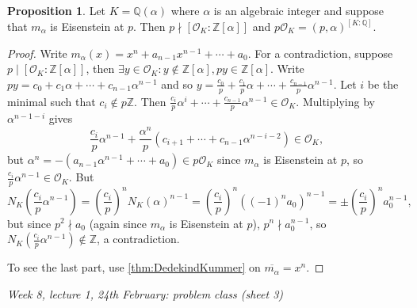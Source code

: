 \documentclass{article}
\newcommand{\Z}{\mathbb{Z}}
\newcommand{\Q}{\mathbb{Q}}
\newcommand{\ri}{\mathcal{O}}
\theoremstyle{definition}
\newtheorem{prop}[defn]{Proposition}
\begin{document}
\begin{prop}
\label{prop:minpoliseisen}
Let $K=\Q(\alpha)$ where $\alpha$ is an algebraic integer and suppose that $m_\alpha$ is Eisenstein at $p$. Then $p\nmid [\ri_K:\Z[\alpha]]$ and $p\ri_K=(p,\alpha)^{[K:\Q]}$.
\end{prop}
\begin{proof}
Write $m_\alpha(x)=x^n+a_{n-1}x^{n-1}+\cdots+a_0$. For a contradiction, suppose $p\mid [\ri_K:\Z[\alpha]]$, then $\exists y\in\ri_K:y\notin\Z[\alpha],py\in\Z[\alpha]$. Write $py=c_0+c_1\alpha+\cdots+c_{n-1}\alpha^{n-1}$ and so $y=\frac{c_0}{p}+\frac{c_1}{p}\alpha+\cdots+\frac{c_{n-1}}{p}\alpha^{n-1}$. Let $i$ be the minimal such that $c_i\notin p\Z$. Then $\frac{c_i}{p}\alpha^i+\cdots+\frac{c_{n-1}}{p}\alpha^{n-1}\in\ri_K$. Multiplying by $\alpha^{n-1-i}$ gives
\[
\frac{c_i}{p}\alpha^{n-1}+\frac{\alpha^n}{p}\left(c_{i+1}+\cdots+c_{n-1}\alpha^{n-i-2}\right)\in\ri_K,
\]
but $\alpha^n=-(a_{n-1}\alpha^{n-1}+\cdots+a_0)\in p\ri_K$ since $m_\alpha$ is Eisenstein at $p$, so $\frac{c_i}{p}\alpha^{n-1}\in\ri_K$. But
\[
N_K\left(\frac{c_i}{p}\alpha^{n-1}\right)=\left(\frac{c_i}{p}\right)^n N_K(\alpha)^{n-1}=\left(\frac{c_i}{p}\right)^n ((-1)^na_0)^{n-1}=\pm\left(\frac{c_i}{p}\right)^n a_0^{n-1},
\]
but since $p^2\nmid a_0$ (again since $m_\alpha$ is Eisenstein at $p$), $p^n\nmid a_0^{n-1}$, so $N_K\left(\frac{c_i}{p}\alpha^{n-1}\right)\notin\Z$, a contradiction.

To see the last part, use \ref{thm:DedekindKummer} on $\overline{m_\alpha}=x^n$.
\end{proof}

\begin{flushright}
\textit{Week 8, lecture 1, 24th February: problem class (sheet 3)}
\end{flushright}
\end{document}
